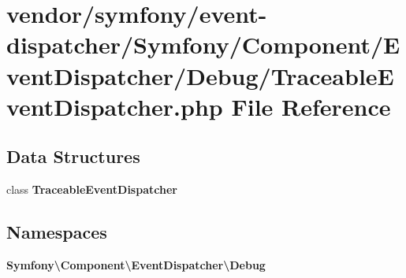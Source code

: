 \section{vendor/symfony/event-\/dispatcher/\+Symfony/\+Component/\+Event\+Dispatcher/\+Debug/\+Traceable\+Event\+Dispatcher.php File Reference}
\label{event-dispatcher_2_symfony_2_component_2_event_dispatcher_2_debug_2_traceable_event_dispatcher_8php}
\subsection*{Data Structures}
\begin{DoxyCompactItemize}
\item 
class {\bf Traceable\+Event\+Dispatcher}
\end{DoxyCompactItemize}
\subsection*{Namespaces}
\begin{DoxyCompactItemize}
\item 
 {\bf Symfony\textbackslash{}\+Component\textbackslash{}\+Event\+Dispatcher\textbackslash{}\+Debug}
\end{DoxyCompactItemize}

